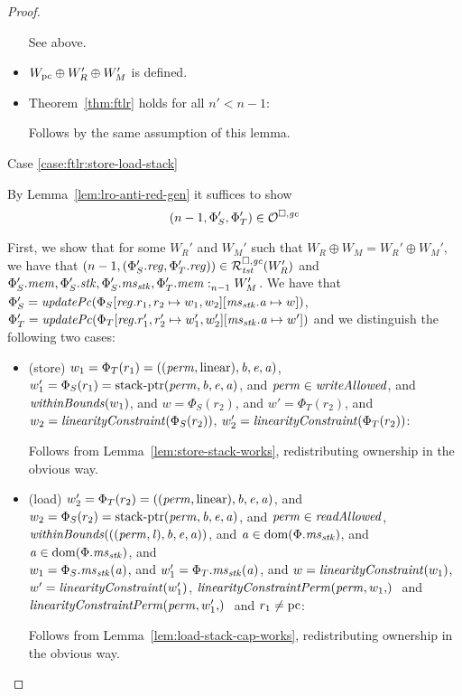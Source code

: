 \begin{proof}
\begin{itemize}
    See above.

  \item $W_\pcreg \oplus W_R' \oplus W_M'$ is defined.

  \item Theorem~\ref{thm:ftlr} holds for all $n' < n-1$:

    Follows by the same assumption of this lemma.
  \end{itemize}

  Case \ref{case:ftlr:store-load-stack}

  By Lemma~\ref{lem:lro-anti-red-gen} it suffices to show
  \[
    \npair[n-1]{\Phi_S',\Phi_T'} \in \lro
  \]

  First, we show that for some $W_R'$ and $W_M'$ such that $W_R \oplus W_M = W_R' \oplus W_M'$, we have that $\npair[n-1]{(\Phi_S'.\reg,\Phi_T'.\reg)} \in \lrrg{\trust}(W_R')$ and $\memSat[n-1]{\Phi_S'.\mem,\Phi_S'.\stk,\Phi_S'.\ms_\stk,\Phi_T'.\mem}{W_M'}$.
  We have that $\Phi_S' = \updPcAddr{\Phi_S\updReg{r_1,r_2}{w_1,w_2}\update{\ms_\stk.\aaddr}{w}}$, $\Phi_T' = \updPcAddr{\Phi_T\updReg{r_1',r_2'}{w_1',w_2'}\update{\ms_\stk.\aaddr}{w'}}$ and we distinguish the following two cases:
  \begin{itemize}
  \item (store) $w_1 = \Phi_T(r_1) =
        ((\perm,\linear),\baddr,\eaddr,\aaddr)$, $w_1' = \Phi_S(r_1) =
        \stkptr{\perm,\baddr,\eaddr,\aaddr}$, and $\perm \in \writeAllowed{}$, and $\withinBounds{w_1}$, and $w = \Phi_S(r_2)$, and $w' = \Phi_T(r_2)$, and $w_2 = \linCons{\Phi_S(r_2)}$, $w_2' = \linCons{\Phi_T(r_2)}$:

        Follows from Lemma~\ref{lem:store-stack-works}, redistributing ownership in the obvious way.

  \item (load) $ w_2' = \Phi_T(r_2) =
        ((\perm,\linear),\baddr,\eaddr,\aaddr)$, and $w_2 = \Phi_S(r_2) =
        \stkptr{\perm,\baddr,\eaddr,\aaddr}$, and $\perm \in \readAllowed{}$,
        $\withinBounds{((\perm,\lin),\baddr,\eaddr,\aaddr)}$, and $\aaddr \in
        \dom(\Phi.\ms_\stk)$, and $\aaddr \in \dom(\Phi.\ms_\stk)$, and\\
        $w_1 = \Phi_S.\ms_\stk(\aaddr)$, and $w_1' = \Phi_T.\ms_\stk(\aaddr)$, and $w = \linCons{w_1}$, $w' = \linCons{w_1'}$, $\linConsPerm{\perm,w_1}$ and $\linConsPerm{\perm,w_1'}$ and $r_1 \neq \pcreg$:

    Follows from Lemma~\ref{lem:load-stack-cap-works}, redistributing ownership in the obvious way.


\end{itemize}
\end{proof}

